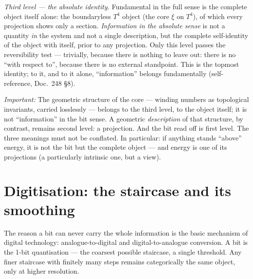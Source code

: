 \emph{Third level --- the absolute identity.} Fundamental in the full sense is
the complete object itself alone: the boundaryless $T^4$ object (the core $\xi$
on $T^4$), of which every projection shows only a section. \emph{Information in
the absolute sense} is not a quantity \emph{in} the system and not a single
description, but the complete self-identity of the object with itself, prior to
any projection. Only this level passes the reversibility test --- trivially,
because there is nothing to leave out: there is no \enquote{with respect to},
because there is no external standpoint. This is the topmost identity; to it, and
to it alone, \enquote{information} belongs fundamentally (self-reference,
Doc.~248 §8).

\emph{Important:} The geometric structure of the core --- winding numbers as
topological invariants, carried losslessly --- belongs to the third level, to the
object itself; it is not \enquote{information} in the bit sense. A geometric
\emph{description} of that structure, by contrast, remains second level: a
projection. And the bit read off is first level. The three meanings must not be
conflated. In particular: if anything stands \enquote{above} energy, it is not
the bit but the complete object --- and energy is one of its projections (a
particularly intrinsic one, but a view).

\section{Digitisation: the staircase and its smoothing}

The reason a bit can never carry the whole information is the basic mechanism of
digital technology: analogue-to-digital and digital-to-analogue conversion. A bit
is the 1-bit quantisation --- the coarsest possible staircase, a single
threshold. Any finer staircase with finitely many steps remains categorically the
same object, only at higher resolution.

